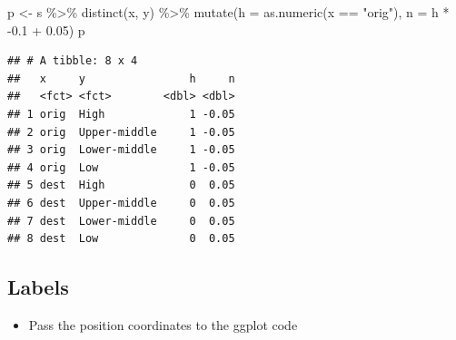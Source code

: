 \documentclass[
]{book}
\newenvironment{Shaded}{\begin{snugshade}}{\end{snugshade}}
\newcommand{\AttributeTok}[1]{\textcolor[rgb]{0.77,0.63,0.00}{#1}}
\newcommand{\FloatTok}[1]{\textcolor[rgb]{0.00,0.00,0.81}{#1}}
\newcommand{\FunctionTok}[1]{\textcolor[rgb]{0.00,0.00,0.00}{#1}}
\newcommand{\NormalTok}[1]{#1}
\newcommand{\OtherTok}[1]{\textcolor[rgb]{0.56,0.35,0.01}{#1}}
\newcommand{\SpecialCharTok}[1]{\textcolor[rgb]{0.00,0.00,0.00}{#1}}
\newcommand{\StringTok}[1]{\textcolor[rgb]{0.31,0.60,0.02}{#1}}
\providecommand{\tightlist}{%
  \setlength{\itemsep}{0pt}\setlength{\parskip}{0pt}}
\begin{document}
\begin{Shaded}
\begin{Highlighting}[]
\NormalTok{p }\OtherTok{\textless{}{-}}\NormalTok{ s }\SpecialCharTok{\%\textgreater{}\%}
  \FunctionTok{distinct}\NormalTok{(x, y) }\SpecialCharTok{\%\textgreater{}\%}
  \FunctionTok{mutate}\NormalTok{(}\AttributeTok{h =} \FunctionTok{as.numeric}\NormalTok{(x }\SpecialCharTok{==} \StringTok{"orig"}\NormalTok{), }
         \AttributeTok{n =}\NormalTok{ h }\SpecialCharTok{*} \SpecialCharTok{{-}}\FloatTok{0.1} \SpecialCharTok{+} \FloatTok{0.05}\NormalTok{)}
\NormalTok{p}
\end{Highlighting}
\end{Shaded}

\begin{verbatim}
## # A tibble: 8 x 4
##   x     y                h     n
##   <fct> <fct>        <dbl> <dbl>
## 1 orig  High             1 -0.05
## 2 orig  Upper-middle     1 -0.05
## 3 orig  Lower-middle     1 -0.05
## 4 orig  Low              1 -0.05
## 5 dest  High             0  0.05
## 6 dest  Upper-middle     0  0.05
## 7 dest  Lower-middle     0  0.05
## 8 dest  Low              0  0.05
\end{verbatim}

\hypertarget{labels-11}{%
\subsection{Labels}\label{labels-11}}

\begin{itemize}
\tightlist
\item
  Pass the position coordinates to the ggplot code
\end{itemize}
\end{document}
